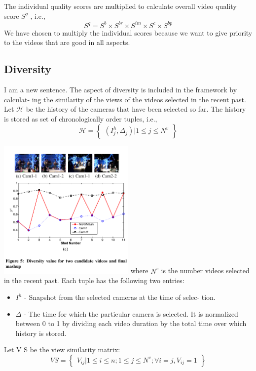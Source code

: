 \documentclass{sig-alternate}
\begin{document}
\begin{itemize}
The individual quality scores are multiplied to calculate overall
video quality score $S^q$ , i.e.,
\[S^q = S^b \times S^{br}\times S^{im}\times S^c\times S^{bp}\tag{12}\]
We have chosen to multiply the individual scores because we
want to give priority to the videos that are good in all aspects.
\end{itemize}


\subsection{Diversity}
I am a new sentence.
The aspect of diversity is included in the framework by calculat-
ing the similarity of the views of the videos selected in the recent
past. Let $\mathcal{H}$ be the history of the cameras that have been selected
so far. The history is stored as set of chronologically order tuples,
i.e.,
\[\mathcal{H} = \begin{Bmatrix} (I^h_j,\Delta _j)|1 \le j \le N^v \end{Bmatrix}\tag{13}\]

\includegraphics[width=0.5\textwidth, left]{four.pdf}
where $N^v$ is the number videos selected in the recent past. Each
tuple has the following two entries:
\begin{itemize}
\item $I^h$ - Snapshot from the selected cameras at the time of selec-
tion.
\item $\Delta$ - The time for which the particular camera is selected. It
is normalized between 0 to 1 by dividing each video duration
by the total time over which history is stored.
\end{itemize}
Let V S be the view similarity matrix:
\[VS = \begin{Bmatrix} V_{ij}|1 \le i \le n; 1\le j \le N^v; \forall i = j, V_{ij} = 1 \end{Bmatrix}\tag{14}\]
\end{document}
